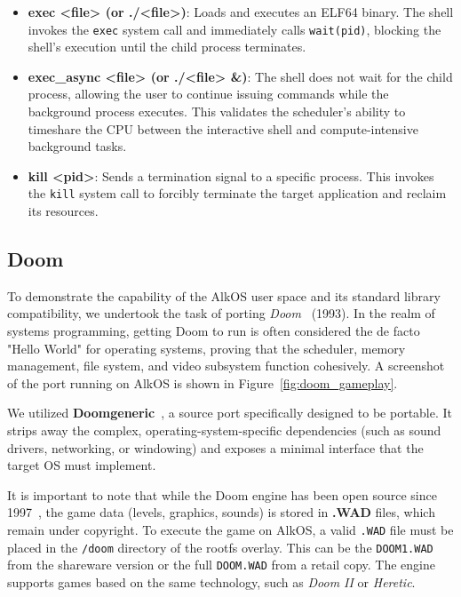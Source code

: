 \documentclass[a4paper,10pt,twoside]{report}
\theoremstyle{definition}
\begin{document}
\begin{itemize}
    \item \textbf{exec <file> (or ./<file>)}: Loads and executes an ELF64 binary. The shell invokes the \texttt{exec} system call and immediately calls \texttt{wait(pid)}, blocking the shell's execution until the child process terminates.

    \item \textbf{exec\_async <file> (or ./<file> \&)}: The shell does not wait for the child process, allowing the user to continue issuing commands while the background process executes. This validates the scheduler's ability to timeshare the CPU between the interactive shell and compute-intensive background tasks.

    \item \textbf{kill <pid>}: Sends a termination signal to a specific process. This invokes the \texttt{kill} system call to forcibly terminate the target application and reclaim its resources.
\end{itemize}

\subsection{Doom}

To demonstrate the capability of the AlkOS user space and its standard library compatibility, we undertook the task of porting \textit{Doom}~\cite{idsoftware1993doom} (1993). In the realm of systems programming, getting Doom to run is often considered the de facto "Hello World" for operating systems, proving that the scheduler, memory management, file system, and video subsystem function cohesively. A screenshot of the port running on AlkOS is shown in Figure~\ref{fig:doom_gameplay}.

We utilized \textbf{Doomgeneric}~\cite{doomgeneric}, a source port specifically designed to be portable. It strips away the complex, operating-system-specific dependencies (such as sound drivers, networking, or windowing) and exposes a minimal interface that the target OS must implement.

It is important to note that while the Doom engine has been open source since 1997~\cite{idsoftware1997doomsource}, the game data (levels, graphics, sounds) is stored in \textbf{.WAD} files, which remain under copyright. To execute the game on AlkOS, a valid \texttt{.WAD} file must be placed in the \texttt{/doom} directory of the rootfs overlay. This can be the \texttt{DOOM1.WAD} from the shareware version or the full \texttt{DOOM.WAD} from a retail copy. The engine supports games based on the same technology, such as \textit{Doom II} or \textit{Heretic}.
\end{document}
